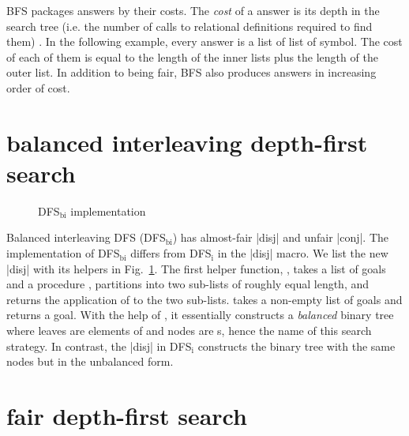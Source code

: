 \documentclass[format=acmlarge, review=true, authordraft=true]{acmart}
\begin{document}
BFS packages answers by their costs. The \emph{cost} of a answer is its 
depth in the search tree (i.e. the number of calls to relational definitions 
required to find them) \citet{seres1999algebra}. In the following example, 
every answer is a list of list of symbol. The cost of each of them is equal to 
the length of the inner lists plus the length of the outer list. In addition to 
being fair, BFS also produces answers in increasing order of cost.

\begin{center}
	\begin{schemeregion}
	\end{schemeregion}
\end{center}

\section{balanced interleaving depth-first search}

\begin{figure}
	\caption{DFS$_\textrm{bi}$ implementation}
	\label{balanced-disj}
\end{figure}

Balanced interleaving DFS (DFS$_\textrm{bi}$) has almost-fair \scheme|disj| and unfair \scheme|conj|. 
The implementation of DFS$_\textrm{bi}$ differs from DFS$_\textrm{i}$ in the \scheme|disj| macro. We list the 
new \scheme|disj| with its helpers in Fig.~\ref{balanced-disj}. The first helper 
function, , takes a list of goals  and a procedure 
, partitions  into two sub-lists of roughly equal length, 
and returns the application of  to the two sub-lists.  
takes a non-empty list of goals  and returns a goal. With the help 
of , it essentially constructs a \emph{balanced} binary tree 
where leaves are elements of  and nodes are s, hence 
the name of this search strategy. In contrast, the \scheme|disj| in DFS$_\textrm{i}$
constructs the binary tree with the same nodes but in the unbalanced form.

\section{fair depth-first search}
\end{document}
